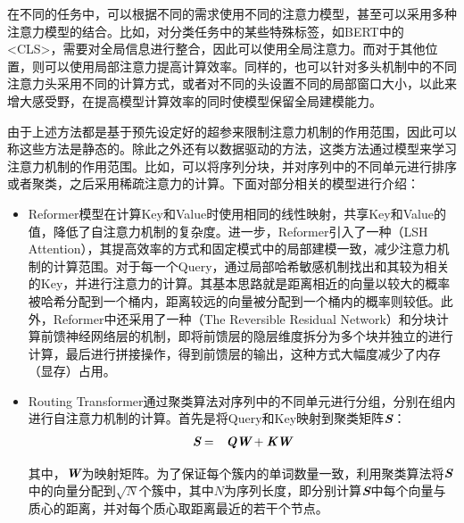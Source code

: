 \parinterval 在不同的任务中，可以根据不同的需求使用不同的注意力模型，甚至可以采用多种注意力模型的结合。比如，对分类任务中的某些特殊标签，如BERT中的<CLS>，需要对全局信息进行整合，因此可以使用全局注意力。而对于其他位置，则可以使用局部注意力提高计算效率。同样的，也可以针对多头机制中的不同注意力头采用不同的计算方式，或者对不同的头设置不同的局部窗口大小，以此来增大感受野，在提高模型计算效率的同时使模型保留全局建模能力。

\parinterval 由于上述方法都是基于预先设定好的超参来限制注意力机制的作用范围，因此可以称这些方法是静态的。除此之外还有以数据驱动的方法，这类方法通过模型来学习注意力机制的作用范围。比如，可以将序列分块，并对序列中的不同单元进行排序或者聚类，之后采用稀疏注意力的计算。下面对部分相关的模型进行介绍：

\begin{itemize}
\vspace{0.5em}
\item Reformer模型在计算Key和Value时使用相同的线性映射，共享Key和Value的值，降低了自注意力机制的复杂度。进一步，Reformer引入了一种{\small{}}（LSH Attention），其提高效率的方式和固定模式中的局部建模一致，减少注意力机制的计算范围。对于每一个Query，通过局部哈希敏感机制找出和其较为相关的Key，并进行注意力的计算。其基本思路就是距离相近的向量以较大的概率被哈希分配到一个桶内，距离较远的向量被分配到一个桶内的概率则较低。此外，Reformer中还采用了一种{\small{}}（The Reversible Residual Network）和分块计算前馈神经网络层的机制，即将前馈层的隐层维度拆分为多个块并独立的进行计算，最后进行拼接操作，得到前馈层的输出，这种方式大幅度减少了内存（显存）占用。

\vspace{0.5em}
\item Routing Transformer通过聚类算法对序列中的不同单元进行分组，分别在组内进行自注意力机制的计算。首先是将Query和Key映射到聚类矩阵$\textbf{\em S}$：
\begin{eqnarray}
\textbf{\em S} &=& \textbf{\em Q} \textbf{\em W} + \textbf{\em K} \textbf{\em W}
\label{eq:15-24}
\end{eqnarray}

\noindent 其中，$\textbf{\em W}$为映射矩阵。为了保证每个簇内的单词数量一致，利用聚类算法将$\textbf{\em S}$中的向量分配到$\sqrt{N}$个簇中，其中$N$为序列长度，即分别计算$\textbf{\em S}$中每个向量与质心的距离，并对每个质心取距离最近的若干个节点。

\vspace{0.5em}
\end{itemize}

